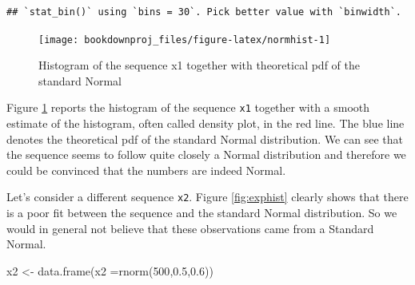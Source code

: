 \documentclass[
]{book}
\newenvironment{Shaded}{\begin{snugshade}}{\end{snugshade}}
\newcommand{\AttributeTok}[1]{\textcolor[rgb]{0.77,0.63,0.00}{#1}}
\newcommand{\DecValTok}[1]{\textcolor[rgb]{0.00,0.00,0.81}{#1}}
\newcommand{\FloatTok}[1]{\textcolor[rgb]{0.00,0.00,0.81}{#1}}
\newcommand{\FunctionTok}[1]{\textcolor[rgb]{0.00,0.00,0.00}{#1}}
\newcommand{\NormalTok}[1]{#1}
\newcommand{\OtherTok}[1]{\textcolor[rgb]{0.56,0.35,0.01}{#1}}
\begin{document}
\begin{verbatim}
## `stat_bin()` using `bins = 30`. Pick better value with `binwidth`.
\end{verbatim}

\begin{figure}

{\centering \texttt{[image: bookdownproj\_files/figure-latex/normhist-1]} 

}

\caption{Histogram of the sequence x1 together with theoretical pdf of the standard Normal}\label{fig:normhist}
\end{figure}

Figure \ref{fig:normhist} reports the histogram of the sequence \texttt{x1} together with a smooth estimate of the histogram, often called density plot, in the red line. The blue line denotes the theoretical pdf of the standard Normal distribution. We can see that the sequence seems to follow quite closely a Normal distribution and therefore we could be convinced that the numbers are indeed Normal.

Let's consider a different sequence \texttt{x2}. Figure \ref{fig:exphist} clearly shows that there is a poor fit between the sequence and the standard Normal distribution. So we would in general not believe that these observations came from a Standard Normal.

\begin{Shaded}
\begin{Highlighting}[]
\NormalTok{x2 }\OtherTok{\textless{}{-}} \FunctionTok{data.frame}\NormalTok{(}\AttributeTok{x2 =}\FunctionTok{rnorm}\NormalTok{(}\DecValTok{500}\NormalTok{,}\FloatTok{0.5}\NormalTok{,}\FloatTok{0.6}\NormalTok{))}
\end{Highlighting}
\end{Shaded}
\end{document}
